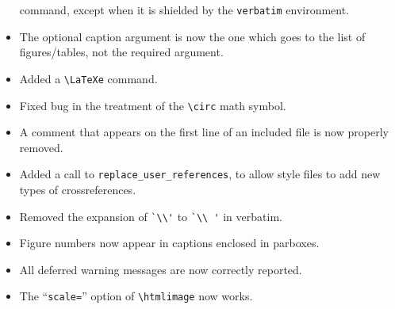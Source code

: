 \begin{htmllist}
\begin{itemize}
\begin{verbatim}
\end{verbatim}
command, except when it is shielded by the \texttt{verbatim}
environment.
\item The optional caption argument is now the one which goes
        to the list of figures/tables, not the required argument.
\item Added a \verb|\LaTeXe| command.
\item Fixed bug in the treatment of the \verb|\circ| math symbol.
\item A comment that appears on the first line of an included file
        is now properly removed.
\item Added a call to \texttt{replace\_user\_references}, to allow
style files to add new types of cross\-ref\-eren\-ces.
\item Removed the expansion of \verb|`\\'| to \verb|`\\ '| in verbatim.
\item Figure numbers now appear in captions enclosed in parboxes.
\item All deferred warning messages are now correctly reported.
\item The ``\texttt{scale=}'' option of \verb|\htmlimage| now works.
\end{itemize}
\end{htmllist}
 
